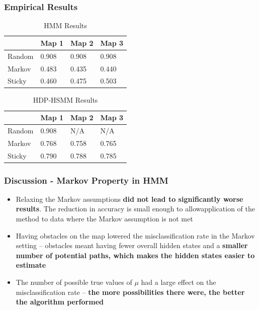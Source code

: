 \documentclass{beamer}
\begin{document}
\begin{frame}
    \frametitle{Empirical Results}
    \begin{table}[H]
    	\centering
    	\begin{tabular}{|l|l|l|l|}
    		\hline
    		& Map 1 & Map 2 & Map 3 \\
    		\hline
    		Random	& 0.908 & 0.908 & 0.908  \\
    		\hline
    		Markov & 0.483 & 0.435 & 0.440 \\
    		\hline
    		Sticky & 0.460 & 0.475& 0.503 \\
    		\hline
    	\end{tabular}
    	\caption{HMM Results}
    \end{table}

    \begin{table}[H]
    	\centering
    	\begin{tabular}{|l|l|l|l|}
    		\hline
    		& Map 1 & Map 2 & Map 3 \\
    		\hline
    		Random	& 0.908 & N/A  & N/A   \\
    		\hline
    		Markov & 0.768 & 0.758 & 0.765 \\
    		\hline
    		Sticky & 0.790 & 0.788 & 0.785  \\
    		\hline
    	\end{tabular}
    	\caption{HDP-HSMM Results}
    \end{table}
\end{frame}

\begin{frame}
	\frametitle{Discussion - Markov Property in HMM}
	\begin{itemize}
		\item Relaxing the Markov assumptions \textbf{did not lead to significantly worse results}. The reduction in accuracy is small enough to allowapplication of the method to data where the Markov assumption is not met
		\item Having obstacles on the map lowered the misclassification rate in the Markov setting -- obstacles meant having fewer overall hidden states and a \textbf{smaller number of potential paths, which makes the hidden states easier to estimate}
		\item The number of possible true values of $\mu$ had a large effect on the misclassification rate -- \textbf{the more possibilities there were, the better the algorithm performed}
	\end{itemize}
\end{frame}
\end{document}
